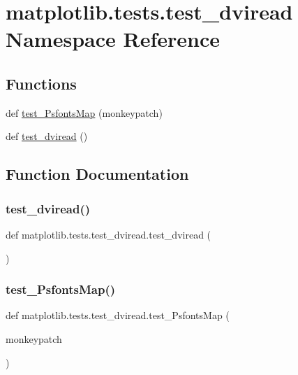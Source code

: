\hypertarget{namespacematplotlib_1_1tests_1_1test__dviread}{}\section{matplotlib.\+tests.\+test\+\_\+dviread Namespace Reference}
\label{namespacematplotlib_1_1tests_1_1test__dviread}
\subsection*{Functions}
\begin{DoxyCompactItemize}
\item 
def \hyperlink{namespacematplotlib_1_1tests_1_1test__dviread_af3110d4ee1fc7775ae6c3fd37877e6d9}{test\+\_\+\+Psfonts\+Map} (monkeypatch)
\item 
def \hyperlink{namespacematplotlib_1_1tests_1_1test__dviread_a1c4f8bc3235005eaf11effb8f4861f02}{test\+\_\+dviread} ()
\end{DoxyCompactItemize}


\subsection{Function Documentation}
\mbox{\label{namespacematplotlib_1_1tests_1_1test__dviread_a1c4f8bc3235005eaf11effb8f4861f02}} 
\subsubsection{\texorpdfstring{test\+\_\+dviread()}{test\_dviread()}}
{\footnotesize\ttfamily def matplotlib.\+tests.\+test\+\_\+dviread.\+test\+\_\+dviread (\begin{DoxyParamCaption}{ }\end{DoxyParamCaption})}

\mbox{\label{namespacematplotlib_1_1tests_1_1test__dviread_af3110d4ee1fc7775ae6c3fd37877e6d9}} 
\subsubsection{\texorpdfstring{test\+\_\+\+Psfonts\+Map()}{test\_PsfontsMap()}}
{\footnotesize\ttfamily def matplotlib.\+tests.\+test\+\_\+dviread.\+test\+\_\+\+Psfonts\+Map (\begin{DoxyParamCaption}\item[{}]{monkeypatch }\end{DoxyParamCaption})}

